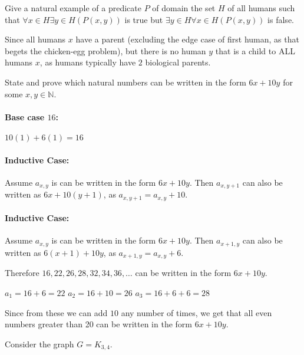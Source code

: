 \documentclass[letterpaper,12pt,addpoints,answers]{exam}
\begin{document}
\begin{questions}
    \question[4] Give a natural example of a predicate $P$ of domain the set $H$ of all humans such that $\forall x\in H \exists y \in H (P(x,y))$ is true but $\exists y\in H\forall x\in H (P(x,y))$ is false.
    \setlength\answerlinelength{5in}
    \begin{solutionorlines}
        Since all humans $x$ have a parent (excluding the edge case of first human, as that begets the chicken-egg problem), but there is no human $y$ that is a child to ALL humans $x$, as humans typically have $2$ biological parents.
    \end{solutionorlines}

    \question[5] State and prove which natural numbers can be written in the form $6x+10y$ for some $x,y\in \mathbb N.$

    \begin{solutionorlines}[5in]
        \paragraph{Base case $16$:} $10 (1) + 6(1) = 16$
        \paragraph{Inductive Case:} Assume $a_{x,y}$ is can be written in the form $6x+10y$.
        Then $a_{x,y+1}$ can also be written as $6x+10(y + 1)$, as $a_{x,y+1} = a_{x,y} + 10$.
        \paragraph{Inductive Case:} Assume $a_{x,y}$ is can be written in the form $6x+10y$.
        Then $a_{x+1,y}$ can also be written as $6(x + 1)+10y$, as $a_{x+1,y} = a_{x,y} + 6$.

        Therefore $16,22,26,28,32,34,36,\dots$ can be written in the form $6x+10y$.

        $a_1 = 16 + 6 = 22$
        $a_2 = 16 + 10 = 26$
        $a_3 = 16 + 6 + 6 = 28$

        Since from these we can add $10$ any number of times, we get that all even numbers greater than 20 can be written in the form $6x+10y$.
    \end{solutionorlines}

    \question Consider the graph $G=K_{3,4}.$
\end{questions}
\end{document}
